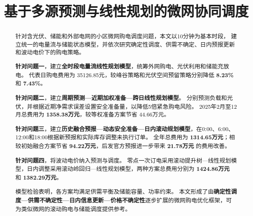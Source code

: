 \title{基于多源预测与线性规划的微网协同调度}
\date{}
\maketitle
\begin{abstract}
针对含光伏、储能和外部电网的小区微网购电调度问题，本文以10分钟为基本时段，
建立统一的电量流与储能状态模型，并依次研究确定性调度、供需不确定、日内预报更新和波动电价下的购电策略。

\textbf{针对问题一}，建立\textbf{全时段电量流线性规划模型}，统筹外网购电、光伏利用和储能充放电。
代表日购电费用为 35126.85元，较峰谷策略和光伏空间预留策略分别降低 \textbf{8.23\%} 和 \textbf{7.43\%}。

\textbf{针对问题二}，建立\textbf{周期预测—近期加权准备—跨日线性规划模型}。
分别预测负载和光伏，并根据近期净需求误差设置安全准备量，以降低5倍紧急购电风险。
2025年2月至12月总费用为 \textbf{1358.38万元}，较等权准备方案节省 44.66万元。

\textbf{针对问题三}，建立\textbf{历史融合预报—动态安全准备—日内滚动规划模型}，在0:00、6:00、12:00和18:00根据新预报和实际库存调整未执行订单。
全年总费用为 \textbf{1314.65万元}；相较初始融合方案节省 \textbf{94.22万元}，后发官方预报进一步带来 \textbf{21.78万元} 的费用改善。

\textbf{针对问题四}，将波动电价纳入预测与调度。
零点一次订电采用滚动提升树—线性规划模型，日内调整采用滚动岭回归—线性规划模型，两种方案总费用分别为 \textbf{1424.86万元} 和 \textbf{1382.29万元}。

模型检验表明，各方案均满足供需平衡及储能容量、功率约束。
本文形成了由\textbf{确定性调度—供需不确定性—日内信息更新—价格不确定性}逐步扩展的微网购电优化框架，可为类似微网的滚动购电与储能调度提供参考。
\end{abstract}
